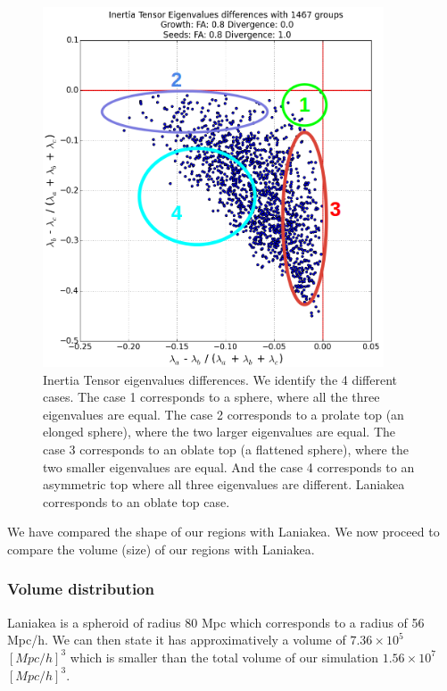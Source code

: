 \documentclass[12pt]{article}
\begin{document}
\FloatBarrier
\begin{figure}[ht]

\centering
  \includegraphics[width=0.9\textwidth]{groups/inertia_cases.png}
\caption{Inertia Tensor eigenvalues differences. We identify
 the 4 different cases. The case 1 corresponds to a sphere,
  where all the three eigenvalues are equal. The case 2
   corresponds to a prolate top (an elonged sphere), where
    the two larger eigenvalues are equal. The case 3
     corresponds to an oblate top (a flattened sphere), where
      the two smaller eigenvalues are equal. And the case 4
       corresponds to an asymmetric top where all three
        eigenvalues are different. Laniakea corresponds to an
         oblate top case.} \label{fg:compare_lan_shape}
\end{figure}
\FloatBarrier


\begin{par}
We have compared the shape of our regions with Laniakea. We
 now proceed to compare the volume (size) of our regions with
  Laniakea.
\end{par}


\subsubsection{Volume distribution}

\begin{par}
Laniakea is a spheroid of radius 80 Mpc  \cite{tully_laniakea_2014} which corresponds to a radius of 56 Mpc/h. We can then state it has approximatively a volume of $7.36  \times 10^5$ $\left[ Mpc/h \right]^3$ which is smaller than the total volume of our simulation $1.56 \times 10^7$ $\left[ Mpc/h \right]^3$.\\
\end{par}
\end{document}
